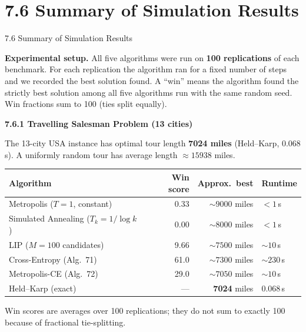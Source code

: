 \documentclass[aspectratio=169,10pt]{beamer}
\begin{document}
\section{7.6 Summary of Simulation Results}

\begin{frame}[allowframebreaks]{7.6 Summary of Simulation Results}

\textbf{Experimental setup.}
All five algorithms were run on \textbf{100 replications} of each benchmark.
For each replication the algorithm ran for a fixed number of steps and we
recorded the best solution found.  A ``win'' means the algorithm found the
strictly best solution among all five algorithms run with the same random
seed.  Win fractions sum to 100 (ties split equally).

\textbf{7.6.1 Travelling Salesman Problem (13 cities)}

The 13-city USA instance has optimal tour length \textbf{7024 miles}
(Held--Karp, 0.068 s).  A uniformly random tour has average length
$\approx 15938$ miles.

\begin{center}
  \small
  \begin{tabular}{lrrl}
    \toprule
    Algorithm & Win score & Approx.\ best & Runtime\\
    \midrule
    Metropolis ($T=1$, constant)         & 0.33  & $\sim 9000$ miles  & $< 1$\,s\\
    Simulated Annealing ($T_k=1/\log k$) & 0.00  & $\sim 8000$ miles  & $< 1$\,s\\
    LIP ($M=100$ candidates)             & 9.66  & $\sim 7500$ miles  & $\sim 10$\,s\\
    Cross-Entropy (Alg.~71)              & 61.0  & $\sim 7300$ miles  & $\sim 230$\,s\\
    Metropolis-CE (Alg.~72)              & 29.0  & $\sim 7050$ miles  & $\sim 10$\,s\\
    \midrule
    Held--Karp (exact)                   & ---   & \textbf{7024} miles & 0.068\,s\\
    \bottomrule
  \end{tabular}
\end{center}

\small
Win scores are averages over 100 replications; they do not sum to exactly
100 because of fractional tie-splitting.

\framebreak


\end{frame}
\end{document}
